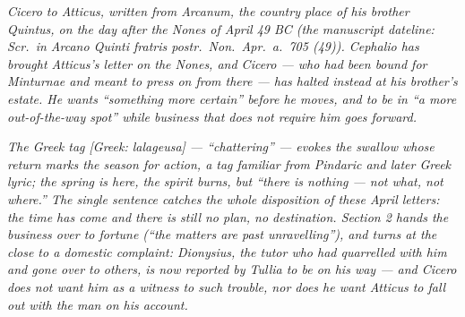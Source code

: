 
\textit{Cicero to Atticus, written from Arcanum, the
country place of his brother Quintus, on the day after the
Nones of April 49 BC (the manuscript dateline: \textit{Scr.\
in Arcano Quinti fratris postr.\ Non.\ Apr.\ a.\ 705 (49)}).
Cephalio has brought Atticus's letter on the Nones, and
Cicero --- who had been bound for Minturnae and meant to
press on from there --- has halted instead at his brother's
estate. He wants ``something more certain'' before he
moves, and to be in ``a more out-of-the-way spot'' while
business that does not require him goes forward.}

\textit{The Greek tag \textit{[Greek: lalageusa]} ---
``chattering'' --- evokes the swallow whose return marks
the season for action, a tag familiar from Pindaric and
later Greek lyric; the spring is here, the spirit burns,
but ``there is nothing --- not what, not where.'' The
single sentence catches the whole disposition of these
April letters: the time has come and there is still no
plan, no destination. Section 2 hands the business over to
fortune (``the matters are past unravelling''), and turns
at the close to a domestic complaint: Dionysius, the tutor
who had quarrelled with him and gone over to others, is
now reported by Tullia to be on his way --- and Cicero does
not want him as a witness to such trouble, nor does he want
Atticus to fall out with the man on his account.}
